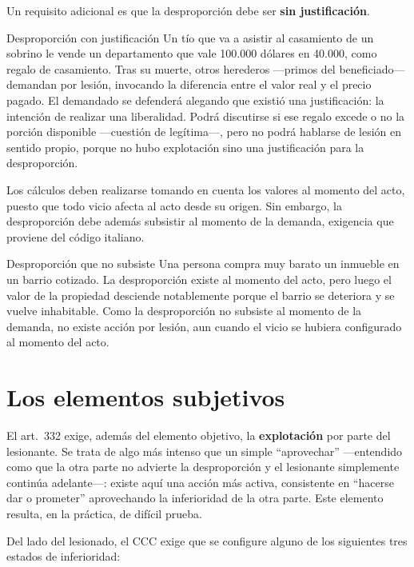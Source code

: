 \documentclass[12pt,oneside]{book}
\begin{document}
Un requisito adicional es que la desproporción debe ser \textbf{sin justificación}.

\begin{example}{Desproporción con justificación}
Un tío que va a asistir al casamiento de un sobrino le vende un departamento que vale 100.000 dólares en 40.000, como regalo de casamiento. Tras su muerte, otros herederos —primos del beneficiado— demandan por lesión, invocando la diferencia entre el valor real y el precio pagado. El demandado se defenderá alegando que existió una justificación: la intención de realizar una liberalidad. Podrá discutirse si ese regalo excede o no la porción disponible —cuestión de legítima—, pero no podrá hablarse de lesión en sentido propio, porque no hubo explotación sino una justificación para la desproporción.
\end{example}

Los cálculos deben realizarse tomando en cuenta los valores al momento del acto, puesto que todo vicio afecta al acto desde su origen. Sin embargo, la desproporción debe además subsistir al momento de la demanda, exigencia que proviene del código italiano.

\begin{example}{Desproporción que no subsiste}
Una persona compra muy barato un inmueble en un barrio cotizado. La desproporción existe al momento del acto, pero luego el valor de la propiedad desciende notablemente porque el barrio se deteriora y se vuelve inhabitable. Como la desproporción no subsiste al momento de la demanda, no existe acción por lesión, aun cuando el vicio se hubiera configurado al momento del acto.
\end{example}

\section{Los elementos subjetivos}

El art.\ 332 exige, además del elemento objetivo, la \textbf{explotación} por parte del lesionante. Se trata de algo más intenso que un simple ``aprovechar'' —entendido como que la otra parte no advierte la desproporción y el lesionante simplemente continúa adelante—: existe aquí una acción más activa, consistente en ``hacerse dar o prometer'' aprovechando la inferioridad de la otra parte. Este elemento resulta, en la práctica, de difícil prueba.

Del lado del lesionado, el CCC exige que se configure alguno de los siguientes tres estados de inferioridad:
\end{document}
